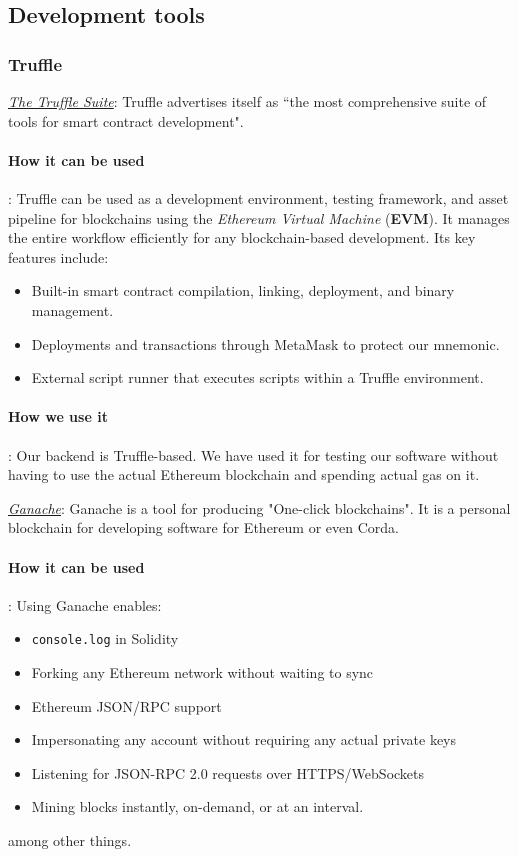 \documentclass{article}
\begin{document}
\subsection{Development tools} 

\subsubsection{Truffle}

\href{https://trufflesuite.com/}{\textit{The Truffle Suite}}:
Truffle advertises itself as ``the most comprehensive suite of tools for smart
contract development". 
\paragraph{How it can be used}:
Truffle can be used as a development environment, testing framework, and asset
pipeline for blockchains using the \emph{Ethereum Virtual Machine} (\textbf{EVM}).
It manages the entire workflow efficiently for any blockchain-based development.
Its key features include:
\begin{itemize}
    \item Built-in smart contract compilation, linking, deployment, and binary management.
    \item Deployments and transactions through MetaMask to protect our mnemonic.
    \item External script runner that executes scripts within a Truffle environment.
\end{itemize}
\paragraph{How we use it}:
Our backend is Truffle-based. We have used it for testing our software without having to use the actual Ethereum blockchain and spending actual gas on it.

\href{https://trufflesuite.com/ganache/}{\textit{Ganache}}:
Ganache is a tool for producing "One-click blockchains". It is a personal blockchain for developing software for Ethereum or even Corda. 
\paragraph{How it can be used}:
Using Ganache enables:
\begin{itemize}
    \item \verb|console.log| in Solidity
    \item Forking any Ethereum network without waiting to sync
    \item Ethereum JSON/RPC support
    \item Impersonating any account without requiring any actual private keys
    \item Listening for JSON-RPC 2.0 requests over HTTPS/WebSockets
    \item Mining blocks instantly, on-demand, or at an interval.
\end{itemize}
among other things.
\end{document}
